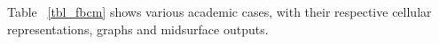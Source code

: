 	
%


	

Table ~\ref{tbl_fbcm} shows various academic cases, with their respective cellular representations, graphs and midsurface outputs.

